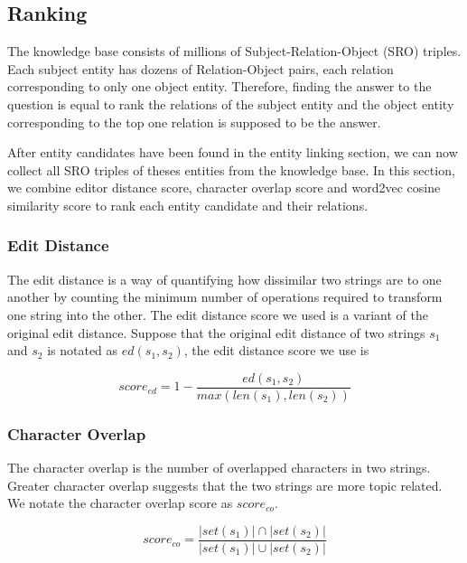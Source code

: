 \documentclass{llncs}
\begin{document}
\subsection{Ranking}

The knowledge base consists of millions of Subject-Relation-Object (SRO) 
triples. Each subject entity has dozens of Relation-Object pairs, each relation 
corresponding to only one object entity. Therefore, finding the answer to the 
question is equal to rank the relations of the subject entity and the object 
entity corresponding to the top one relation is supposed to be the answer.

After entity candidates have been found in the entity linking section, we can 
now collect all SRO triples of theses entities from the knowledge base. In this 
section, we combine editor distance score, character overlap score and word2vec 
cosine similarity score to rank each entity candidate and their relations.

\subsubsection{Edit Distance}
The edit distance is a way of quantifying how dissimilar two strings are to one 
another by counting the minimum number of operations required to transform one 
string into the other. The edit distance score we used is a variant of the 
original edit distance. Suppose that the original edit distance of two strings 
$s_1$ and $s_2$ is notated as $ ed(s_1, s_2) $, the edit distance score we use is

  \begin{equation}
    score_{ed} = 1 - \frac{ed(s_1, s_2)}{max(len(s_1), len(s_2))}
  \end{equation}

\subsubsection{Character Overlap}
The character overlap is the number of overlapped characters in two strings. 
Greater character overlap suggests that the two strings are more topic related.
We notate the character overlap score as $ score_{co} $.

\begin{equation}
    score_{co} = \frac{|set(s_1)| \cap |set(s_2)|}{|set(s_1)| \cup |set(s_2)|}
  \end{equation}
\end{document}
